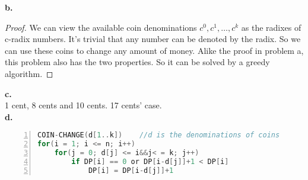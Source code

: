 \documentclass{article}
\begin{document}
\textbf{b.}
\begin{proof}
	We can view the available coin denominations $c^0,c^1,\dots,c^k$ as the radixes of c-radix numbers.  
	It's trivial that any number can be denoted by the radix. So we can use these coins to change any amount
	of money. Alike the proof in problem a, this problem also has the two properties. So it can be solved by
	a greedy algorithm.
\end{proof}
\textbf{c.}\\
1 cent, 8 cents and 10 cents. 17 cents' case.\\ 
\textbf{d.}
\begin{lstlisting}[language=C,numbers=left]
COIN-CHANGE(d[1..k])	//d is the denominations of coins
for(i = 1; i <= n; i++)
	for(j = 0; d[j] <= i&&j< = k; j++)
		if DP[i] == 0 or DP[i-d[j]]+1 < DP[i]
			DP[i] = DP[i-d[j]]+1
\end{lstlisting}
\end{document}
